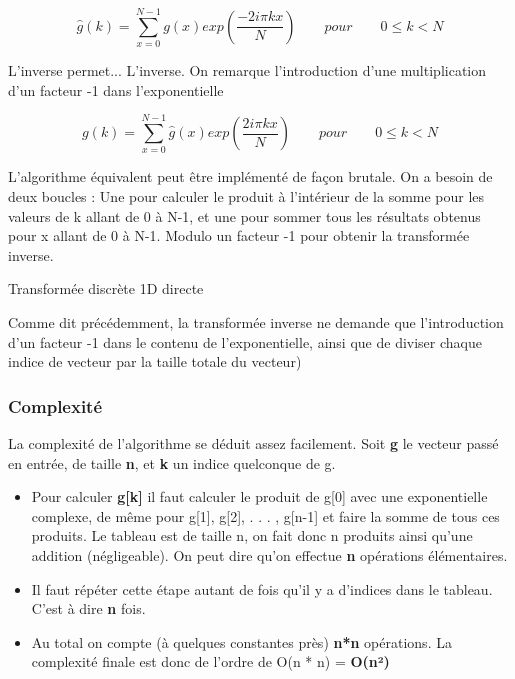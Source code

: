 \documentclass{article}
\begin{document}
\begin{equation}
		\widehat{g}(k) = \sum_{x = 0}^{N-1}g(x) exp(\frac{-2i\pi kx}{N}) \qquad pour \qquad 0 \leq k < N
\end{equation}

\noindent L'inverse permet... L'inverse. On remarque l'introduction d'une multiplication d'un facteur -1 dans l'exponentielle

\begin{equation}
	g(k) = \sum_{x = 0}^{N-1}\widehat{g}(x) exp(\frac{2i\pi kx}{N}) \qquad pour \qquad 0 \leq k < N
\end{equation}


\noindent L'algorithme équivalent peut être implémenté de façon brutale. On a besoin de deux boucles : Une pour calculer le produit à l'intérieur de la somme pour les valeurs de k allant de 0 à N-1, et une pour sommer tous les résultats obtenus pour x allant de 0 à N-1. Modulo un facteur -1 pour obtenir la transformée inverse.


\begin{algorithm}
	\caption{Transformée discrète 1D directe}\label{alg:cap}
\end{algorithm}

Comme dit précédemment, la transformée inverse ne demande que l'introduction d'un facteur -1 dans le contenu de l'exponentielle, ainsi que de diviser chaque indice de vecteur par la taille totale du vecteur)

\subsubsection{Complexité}

La complexité de l'algorithme se déduit assez facilement. Soit \textbf{g} le vecteur passé en entrée, de taille \textbf{n}, et \textbf{k} un indice quelconque de g.
\begin{itemize}
	\item Pour calculer \textbf{g[k]} il faut calculer le produit de g[0] avec une exponentielle complexe, de même pour g[1], g[2], . . . , g[n-1] et faire la somme de tous ces produits. Le tableau est de taille n, on fait donc n produits ainsi qu'une addition (négligeable). On peut dire qu'on effectue \textbf{n} opérations élémentaires.
	\item Il faut répéter cette étape autant de fois qu'il y a d'indices dans le tableau. C'est à dire \textbf{n} fois.
	\item Au total on compte (à quelques constantes près) \textbf{n*n} opérations.
	La complexité finale est donc de l'ordre de O(n * n) = \textbf{O(n²)} 
\end{itemize}
\end{document}
